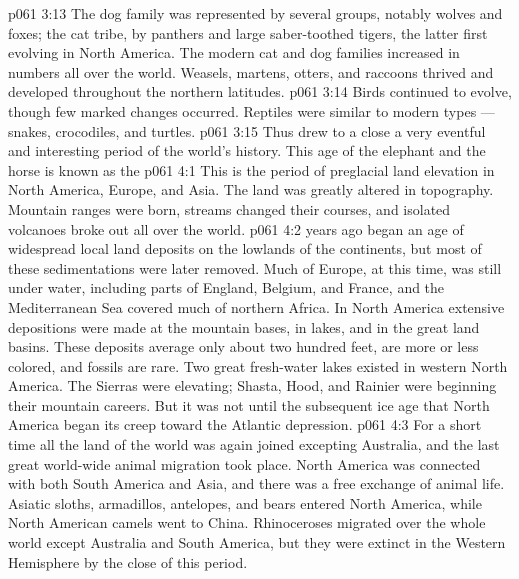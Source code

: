 \vs p061 3:13 The dog family was represented by several groups, notably wolves and foxes; the cat tribe, by panthers and large saber\hyp{}toothed tigers, the latter first evolving in North America. The modern cat and dog families increased in numbers all over the world. Weasels, martens, otters, and raccoons thrived and developed throughout the northern latitudes.
\vs p061 3:14 Birds continued to evolve, though few marked changes occurred. Reptiles were similar to modern types --- snakes, crocodiles, and turtles.
\vs p061 3:15 \pc Thus drew to a close a very eventful and interesting period of the world’s history. This age of the elephant and the horse is known as the 
\vs p061 4:1 This is the period of preglacial land elevation in North America, Europe, and Asia. The land was greatly altered in topography. Mountain ranges were born, streams changed their courses, and isolated volcanoes broke out all over the world.
\vs p061 4:2 \pc {} years ago began an age of widespread local land deposits on the lowlands of the continents, but most of these sedimentations were later removed. Much of Europe, at this time, was still under water, including parts of England, Belgium, and France, and the Mediterranean Sea covered much of northern Africa. In North America extensive depositions were made at the mountain bases, in lakes, and in the great land basins. These deposits average only about two hundred feet, are more or less colored, and fossils are rare. Two great fresh\hyp{}water lakes existed in western North America. The Sierras were elevating; Shasta, Hood, and Rainier were beginning their mountain careers. But it was not until the subsequent ice age that North America began its creep toward the Atlantic depression.
\vs p061 4:3 For a short time all the land of the world was again joined excepting Australia, and the last great world\hyp{}wide animal migration took place. North America was connected with both South America and Asia, and there was a free exchange of animal life. Asiatic sloths, armadillos, antelopes, and bears entered North America, while North American camels went to China. Rhinoceroses migrated over the whole world except Australia and South America, but they were extinct in the Western Hemisphere by the close of this period.
